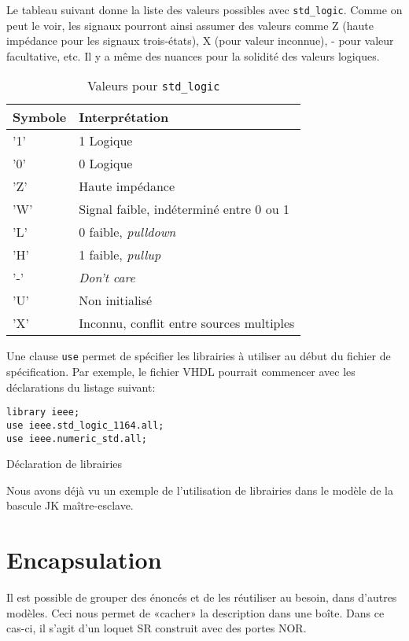 \documentclass[letter, oneside]{book}
\begin{document}
Le tableau suivant donne la liste des valeurs possibles avec
\texttt{std\_logic}. Comme on peut le voir, les signaux pourront ainsi assumer
des valeurs comme Z (haute impédance pour les signaux trois-états), X
(pour valeur inconnue), - pour valeur facultative, etc. Il y a même
des nuances pour la solidité des valeurs logiques.

\begin{table}[htbp]
\caption{\label{tab:org58240a0}Valeurs pour \texttt{std\_logic}}
\centering
\begin{tabular}{ll}
Symbole & Interprétation\\[0pt]
\hline
'1' & 1 Logique\\[0pt]
'0' & 0 Logique\\[0pt]
'Z' & Haute impédance\\[0pt]
'W' & Signal faible, indéterminé entre 0 ou 1\\[0pt]
'L' & 0 faible, \emph{pulldown}\\[0pt]
'H' & 1 faible, \emph{pullup}\\[0pt]
'-' & \emph{Don't care}\\[0pt]
'U' & Non initialisé\\[0pt]
'X' & Inconnu, conflit entre sources multiples\\[0pt]
\end{tabular}
\end{table}

Une clause \texttt{use} permet de spécifier les librairies à utiliser au
début du fichier de spécification. Par exemple, le fichier VHDL
pourrait commencer avec les déclarations du listage suivant:

\begin{listing}[htbp]
\begin{verbatim}
library ieee;
use ieee.std_logic_1164.all;
use ieee.numeric_std.all;
\end{verbatim}
\caption{Déclaration de librairies}
\end{listing}

Nous avons déjà vu un exemple de l'utilisation de librairies dans le modèle
de la bascule JK maître-esclave.

\section{Encapsulation}
\label{sec:org56c3875}

Il est possible de grouper des énoncés et de les réutiliser
au besoin, dans d'autres modèles. Ceci nous permet de «cacher» la
description dans une boîte. Dans ce cas-ci, il s'agit d'un loquet SR
construit avec des portes NOR.
\end{document}
